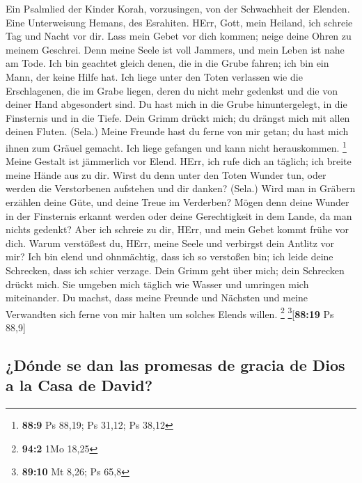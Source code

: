  Ein Psalmlied der Kinder Korah, vorzusingen, von der
Schwachheit der Elenden. Eine Unterweisung Hemans, des Esrahiten.
 HErr, Gott, mein Heiland, ich schreie Tag und Nacht vor
dir.  Lass mein Gebet vor dich kommen; neige deine Ohren
zu meinem Geschrei.  Denn meine Seele ist voll Jammers,
und mein Leben ist nahe am Tode.  Ich bin geachtet gleich
denen, die in die Grube fahren; ich bin ein Mann, der keine Hilfe hat.
 Ich liege unter den Toten verlassen wie die Erschlagenen,
die im Grabe liegen, deren du nicht mehr gedenkst und die von deiner
Hand abgesondert sind.  Du hast mich in die Grube
hinuntergelegt, in die Finsternis und in die Tiefe.  Dein
Grimm drückt mich; du drängst mich mit allen deinen Fluten. (Sela.)
 Meine Freunde hast du ferne von mir getan; du hast mich
ihnen zum Gräuel gemacht. Ich liege gefangen und kann nicht
herauskommen. \footnote{\textbf{88:9} Ps 88,19; Ps 31,12; Ps 38,12}
 Meine Gestalt ist jämmerlich vor Elend. HErr, ich rufe
dich an täglich; ich breite meine Hände aus zu dir. 
Wirst du denn unter den Toten Wunder tun, oder werden die Verstorbenen
aufstehen und dir danken? (Sela.)  Wird man in Gräbern
erzählen deine Güte, und deine Treue im Verderben?  Mögen
denn deine Wunder in der Finsternis erkannt werden oder deine
Gerechtigkeit in dem Lande, da man nichts gedenkt?  Aber
ich schreie zu dir, HErr, und mein Gebet kommt frühe vor dich.
 Warum verstößest du, HErr, meine Seele und verbirgst
dein Antlitz vor mir?  Ich bin elend und ohnmächtig, dass
ich so verstoßen bin; ich leide deine Schrecken, dass ich schier
verzage.  Dein Grimm geht über mich; dein Schrecken
drückt mich.  Sie umgeben mich täglich wie Wasser und
umringen mich miteinander.  Du machst, dass meine Freunde
und Nächsten und meine Verwandten sich ferne von mir halten um solches
Elends willen. \footnote{\textbf{94:2} 1Mo 18,25}
\footnote{\textbf{89:10} Mt 8,26; Ps 65,8}{[}\textbf{88:19} Ps 88,9{]}

\hypertarget{duxf3nde-se-dan-las-promesas-de-gracia-de-dios-a-la-casa-de-david}{%
\subsection{¿Dónde se dan las promesas de gracia de Dios a la Casa de
David?}\label{duxf3nde-se-dan-las-promesas-de-gracia-de-dios-a-la-casa-de-david}}

